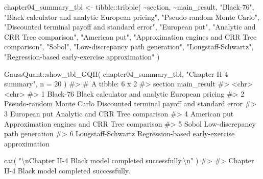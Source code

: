 \documentclass[
  letterpaper,
  DIV=11,
  numbers=noendperiod]{scrreprt}
\newenvironment{Shaded}{\begin{snugshade}}{\end{snugshade}}
\newcommand{\AttributeTok}[1]{\textcolor[rgb]{0.40,0.45,0.13}{#1}}
\newcommand{\CommentTok}[1]{\textcolor[rgb]{0.37,0.37,0.37}{#1}}
\newcommand{\DecValTok}[1]{\textcolor[rgb]{0.68,0.00,0.00}{#1}}
\newcommand{\FunctionTok}[1]{\textcolor[rgb]{0.28,0.35,0.67}{#1}}
\newcommand{\NormalTok}[1]{\textcolor[rgb]{0.00,0.23,0.31}{#1}}
\newcommand{\OtherTok}[1]{\textcolor[rgb]{0.00,0.23,0.31}{#1}}
\newcommand{\SpecialCharTok}[1]{\textcolor[rgb]{0.37,0.37,0.37}{#1}}
\newcommand{\StringTok}[1]{\textcolor[rgb]{0.13,0.47,0.30}{#1}}
\begin{document}
\begin{Shaded}
\begin{Highlighting}[]
\NormalTok{chapter04\_summary\_tbl }\OtherTok{\textless{}{-}}\NormalTok{ tibble}\SpecialCharTok{::}\FunctionTok{tribble}\NormalTok{(}
  \SpecialCharTok{\textasciitilde{}}\NormalTok{section,                    }\SpecialCharTok{\textasciitilde{}}\NormalTok{main\_result,}
  \StringTok{"Black{-}76"}\NormalTok{,                  }\StringTok{"Black calculator and analytic European pricing"}\NormalTok{,}
  \StringTok{"Pseudo{-}random Monte Carlo"}\NormalTok{, }\StringTok{"Discounted terminal payoff and standard error"}\NormalTok{,}
  \StringTok{"European put"}\NormalTok{,              }\StringTok{"Analytic and CRR Tree comparison"}\NormalTok{,}
  \StringTok{"American put"}\NormalTok{,              }\StringTok{"Approximation engines and CRR Tree comparison"}\NormalTok{,}
  \StringTok{"Sobol"}\NormalTok{,                     }\StringTok{"Low{-}discrepancy path generation"}\NormalTok{,}
  \StringTok{"Longstaff{-}Schwartz"}\NormalTok{,        }\StringTok{"Regression{-}based early{-}exercise approximation"}
\NormalTok{)}

\NormalTok{GaussQuant}\SpecialCharTok{::}\FunctionTok{show\_tbl\_GQH}\NormalTok{(}
\NormalTok{  chapter04\_summary\_tbl,}
  \StringTok{"Chapter II{-}4 summary"}\NormalTok{,}
  \AttributeTok{n =} \DecValTok{20}
\NormalTok{)}
\CommentTok{\#\textgreater{} \# A tibble: 6 x 2}
\CommentTok{\#\textgreater{}   section                   main\_result                                   }
\CommentTok{\#\textgreater{}   \textless{}chr\textgreater{}                     \textless{}chr\textgreater{}                                         }
\CommentTok{\#\textgreater{} 1 Black{-}76                  Black calculator and analytic European pricing}
\CommentTok{\#\textgreater{} 2 Pseudo{-}random Monte Carlo Discounted terminal payoff and standard error }
\CommentTok{\#\textgreater{} 3 European put              Analytic and CRR Tree comparison              }
\CommentTok{\#\textgreater{} 4 American put              Approximation engines and CRR Tree comparison }
\CommentTok{\#\textgreater{} 5 Sobol                     Low{-}discrepancy path generation               }
\CommentTok{\#\textgreater{} 6 Longstaff{-}Schwartz        Regression{-}based early{-}exercise approximation}

\FunctionTok{cat}\NormalTok{(}
  \StringTok{"}\SpecialCharTok{\textbackslash{}n}\StringTok{Chapter II{-}4 Black model completed successfully.}\SpecialCharTok{\textbackslash{}n}\StringTok{"}
\NormalTok{)}
\CommentTok{\#\textgreater{} }
\CommentTok{\#\textgreater{} Chapter II{-}4 Black model completed successfully.}
\end{Highlighting}
\end{Shaded}
\end{document}

